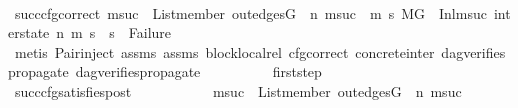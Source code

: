 \begin{isabellebody}
\ \ \ \ \ \ \ \ \isamarkupfalse%
\ succ{\isacharunderscore}{\kern0pt}cfg{\isacharunderscore}{\kern0pt}correct{\isacharcolon}{\kern0pt}\ {\isachardoublequoteopen}{\isacharparenleft}{\kern0pt}{\isasymforall}msuc{}{\isachardot}{\kern0pt}\ \ List{\isachardot}{\kern0pt}member\ {\isacharparenleft}{\kern0pt}out{\isacharunderscore}{\kern0pt}edges{\isacharparenleft}{\kern0pt}G{\isacharparenright}{\kern0pt}\ {\isacharbang}{\kern0pt}\ n{\isacharparenright}{\kern0pt}\ msuc{}\ {\isasymlongrightarrow}\ {\isacharparenleft}{\kern0pt}{\isasymforall}m{}\ s{}{\isachardot}{\kern0pt}\ {\isacharparenleft}{\kern0pt}{\isacharparenleft}{\kern0pt}M{\isacharcomma}{\kern0pt}{\isasymLambda}{\isacharcomma}{\kern0pt}{\isasymGamma}{\isacharcomma}{\kern0pt}{\isasymOmega}{\isacharcomma}{\kern0pt}G\ {\isasymturnstile}\ {\isacharparenleft}{\kern0pt}Inl{\isacharparenleft}{\kern0pt}msuc{}{\isacharparenright}{\kern0pt}{\isacharcomma}{\kern0pt}\ inter{\isacharunderscore}{\kern0pt}state{\isacharparenright}{\kern0pt}\ {\isacharminus}{\kern0pt}n{\isasymrightarrow}{\isacharasterisk}{\kern0pt}\ {\isacharparenleft}{\kern0pt}m{}{\isacharcomma}{\kern0pt}\ s{}{\isacharparenright}{\kern0pt}{\isacharparenright}{\kern0pt}\ {\isasymlongrightarrow}\ s{}\ {\isasymnoteq}\ Failure{\isacharparenright}{\kern0pt}{\isacharparenright}{\kern0pt}{\isacharparenright}{\kern0pt}{\isachardoublequoteclose}\isanewline
\ \ \ \ \ \ \ \ \ \ \isamarkupfalse%
\ {\isacharparenleft}{\kern0pt}metis\ Pair{\isacharunderscore}{\kern0pt}inject\ assms{\isacharparenleft}{\kern0pt}{}{\isacharparenright}{\kern0pt}\ assms{\isacharparenleft}{\kern0pt}{}{\isacharparenright}{\kern0pt}\ block{\isacharunderscore}{\kern0pt}local{\isacharunderscore}{\kern0pt}rel\ cfg{\isacharunderscore}{\kern0pt}correct\ concrete{\isacharunderscore}{\kern0pt}inter{}\ dag{\isacharunderscore}{\kern0pt}verifies{\isacharunderscore}{\kern0pt}propagate\ dag{\isacharunderscore}{\kern0pt}verifies{\isacharunderscore}{\kern0pt}propagate{\isacharunderscore}{\kern0pt}{}{\isacharparenright}{\kern0pt}\isanewline
\isanewline
\ \ \ \ \ \ \ \ \isamarkupfalse%
\ first{\isacharunderscore}{\kern0pt}step\isanewline
\ \ \ \ \ \ \ \ \isamarkupfalse%
\ succ{\isacharunderscore}{\kern0pt}cfg{\isacharunderscore}{\kern0pt}satisfies{\isacharunderscore}{\kern0pt}post{\isacharcolon}{\kern0pt}\ \isanewline
\ \ \ \ \ \ \ \ \ \ {\isachardoublequoteopen}{\isacharparenleft}{\kern0pt}{\isasymforall}msuc{}{\isachardot}{\kern0pt}\ \ List{\isachardot}{\kern0pt}member\ {\isacharparenleft}{\kern0pt}out{\isacharunderscore}{\kern0pt}edges{\isacharparenleft}{\kern0pt}G{\isacharparenright}{\kern0pt}\ {\isacharbang}{\kern0pt}\ n{\isacharparenright}{\kern0pt}\ msuc{}\ {\isasymlongrightarrow}\ \isanewline

\end{isabellebody}
